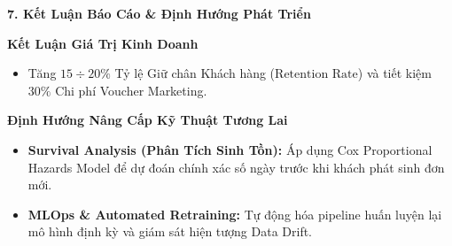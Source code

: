 \documentclass[10pt, aspectratio=169]{beamer}
\begin{document}
\begin{frame}{\textbf{7. Kết Luận Báo Cáo \& Định Hướng Phát Triển}}
    \begin{block}{\textbf{Kết Luận Giá Trị Kinh Doanh}}
        \begin{itemize}
            \item Tăng $15 \div 20\%$ Tỷ lệ Giữ chân Khách hàng ($\text{Retention Rate}$) và tiết kiệm $30\%$ Chi phí Voucher Marketing.
        \end{itemize}
    \end{block}

    \vspace{0.2cm}
    \begin{block}{\textbf{Định Hướng Nâng Cấp Kỹ Thuật Tương Lai}}
        \begin{itemize}
            \item \textbf{Survival Analysis (Phân Tích Sinh Tồn):} Áp dụng Cox Proportional Hazards Model để dự đoán chính xác số ngày trước khi khách phát sinh đơn mới.
            \item \textbf{MLOps \& Automated Retraining:} Tự động hóa pipeline huấn luyện lại mô hình định kỳ và giám sát hiện tượng Data Drift.
        \end{itemize}
    \end{block}
\end{frame}
\end{document}
